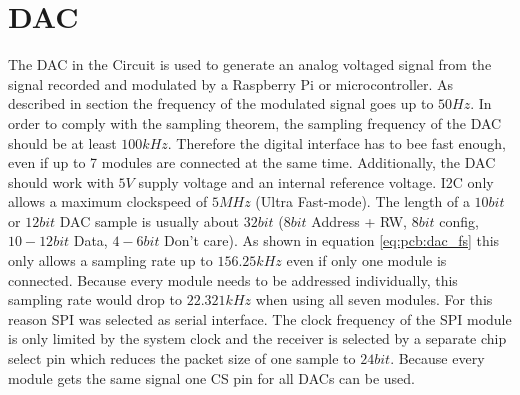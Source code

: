 \section{DAC}
%
%
The DAC in the Circuit is used to generate an analog voltaged signal from the signal recorded and modulated by a Raspberry Pi or microcontroller.\p
%
As described in section  the frequency of the modulated signal goes up to $50Hz$.
In order to comply with the sampling theorem, the sampling frequency of the DAC should be at least $100kHz$. Therefore the digital interface has to bee fast enough, even if up to 7 modules are connected at the same time. Additionally, the DAC should work with $5V$ supply voltage and an internal reference voltage.\p
%
I2C only allows a maximum clockspeed of $5MHz$ (Ultra Fast-mode).\cite{nxp_i2c-bus_2021} The length of a $10bit$ or $12bit$ DAC sample is usually about $32bit$ ($8bit$ Address + RW, $8bit$ config, $10 - 12bit$ Data, $4 - 6bit$ Don't care). As shown in equation \ref{eq:pcb:dac_fs} this only allows a sampling rate up to $156.25kHz$ even if only one module is connected. Because every module needs to be addressed individually, this sampling rate would drop to $22.321kHz$ when using all seven modules. For this reason SPI was selected as serial interface. The clock frequency of the SPI module is only limited by the system clock and the receiver is selected by a separate chip select pin which reduces the packet size of one sample to $24bit$. Because every module gets the same signal one CS pin for all DACs can be used.\p
%
